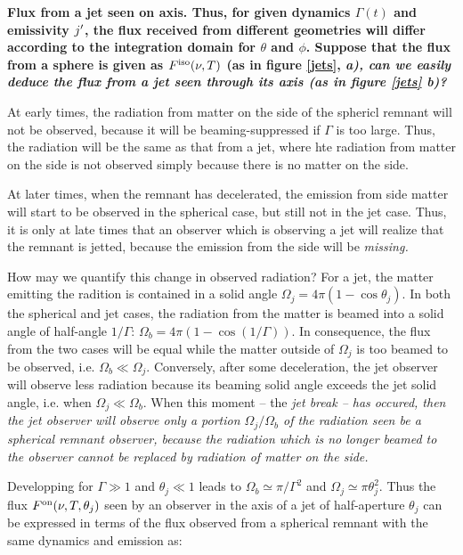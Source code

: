 

\bf{Flux from a jet seen on axis.} Thus, for given dynamics $\Gamma(t)$ and emissivity $j\p$, the flux received from different geometries will differ according to the integration domain for $\theta$ and $\phi$. Suppose that the flux from a sphere is given as $F^\rm{iso}(\nu, T)$ (as in figure \ref{jets}, \it{a}), can we easily deduce the flux from a jet seen through its axis (as in figure \ref{jets} \it{b})?

At early times, the radiation from matter on the side of the sphericl remnant will not be observed, because it will be beaming-suppressed if $\Gamma$ is too large. Thus, the radiation will be the same as that from a jet, where hte radiation from matter on the side is not observed simply because there is no matter on the side.

At later times, when the remnant has decelerated, the emission from side matter will start to be observed in the spherical case, but still not in the jet case. Thus, it is only at late times that an observer which is observing a jet will realize that the remnant is jetted, because the emission from the side will be \it{missing}.

How may we quantify this change in observed radiation? For a jet, the matter emitting the radition is contained in a solid angle $\Omega_j = 4\pi(1 - \cos \theta_j)$. In both the spherical and jet cases, the radiation from the matter is beamed into a solid angle of half-angle $1/\Gamma$: $\Omega_b = 4\pi(1 - \cos(1/\Gamma))$. In consequence, the flux from the two cases will be equal while the matter outside of $\Omega_j$ is too beamed to be observed, i.e. $\Omega_b \ll \Omega_j$. Conversely, after some deceleration, the jet observer will observe less radiation because its beaming solid angle exceeds the jet solid angle, i.e. when $\Omega_j \ll \Omega_b$. When this moment -- the \it{jet break} -- has occured, then the jet observer will observe only a portion $\Omega_j/\Omega_b$ of the radiation seen be a spherical remnant observer, because the radiation which is no longer beamed to the observer cannot be replaced by radiation of matter on the side.

Developping for $\Gamma \gg 1$ and $\theta_j \ll 1$ leads to $\Omega_b \simeq \pi/\Gamma^2$ and $\Omega_j \simeq \pi\theta_j^2$. Thus the flux $F^{\rm{on}}(\nu, T, \theta_j)$ seen by an observer in the axis of a jet of half-aperture $\theta_j$ can be expressed in terms of the flux observed from a spherical remnant with the same dynamics and emission as:

